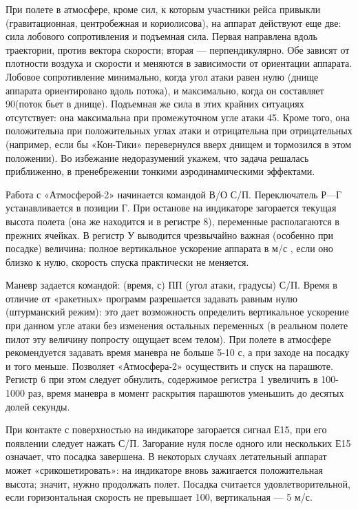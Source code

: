 \documentclass[11pt,a4paper,oneside]{article}
\begin{document}
При полете в атмосфере, кроме сил, к которым участники рейса привыкли (гравитационная, центробежная и кориолисова), на аппарат действуют еще две: сила лобового сопротивления и подъемная сила. Первая направлена вдоль траектории, против вектора скорости; вторая — перпендикулярно. Обе зависят от плотности воздуха и скорости и меняются в зависимости от ориентации аппарата. Лобовое сопротивление минимально, когда угол атаки равен нулю (днище аппарата ориентировано вдоль потока), и максимально, когда он составляет 90\degree (поток бьет в днище). Подъемная же сила в этих крайних ситуациях отсутствует: она максимальна при промежуточном угле атаки 45\degree. Кроме того, она положительна при положительных углах атаки и отрицательна при отрицательных (например, если бы «Кон-Тики» перевернулся вверх днищем и тормозился в этом положении). Во избежание недоразумений укажем, что задача решалась приближенно, в пренебрежении тонкими аэродинамическими эффектами.

Работа с «Атмосферой-2» начинается командой В/О С/П. Переключатель Р—Г устанавливается в позиции Г. При останове на индикаторе загорается текущая высота полета (она же находится и в регистре 8), переменные располагаются в прежних ячейках. В регистр У выводится чрезвычайно важная (особенно при посадке) величина: полное вертикальное ускорение аппарата в м/с , если оно близко к нулю, скорость спуска практически не меняется.

Маневр задается командой: (время, с) ПП (угол атаки, градусы) С/П. Время в отличие от «ракетных» программ разрешается задавать равным нулю (штурманский режим): это дает возможность определить вертикальное ускорение при данном угле атаки без изменения остальных переменных (в реальном полете пилот эту величину попросту ощущает всем телом). При полете в атмосфере рекомендуется задавать время маневра не больше 5-10 с, а при заходе на посадку и того меньше. Позволяет «Атмосфера-2» осуществить и спуск на парашюте. Регистр 6 при этом следует обнулить, содержимое регистра 1 увеличить в 100-1000 раз, время маневра в момент раскрытия парашютов уменьшить до десятых долей секунды.

При контакте с поверхностью на индикаторе загорается сигнал Е15, при его появлении следует нажать С/П. Загорание нуля после одного или нескольких Е15 означает, что посадка завершена. В некоторых случаях летательный аппарат может «срикошетировать»: на индикаторе вновь зажигается положительная высота; значит, нужно продолжать полет. Посадка считается удовлетворительной, если горизонтальная скорость не превышает 100, вертикальная — 5 м/с.
\end{document}
